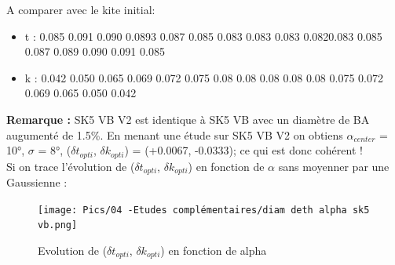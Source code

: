 A comparer avec le kite initial:
\begin{itemize}
    \item t : 0.085 0.091 0.090 0.0893 0.087 0.085 0.083 0.083 0.083 0.0820.083 0.085 0.087 0.089 0.090 0.091 0.085
    \item k : 0.042 0.050 0.065 0.069 0.072 0.075 0.08 0.08 0.08 0.08 0.08 0.075 0.072 0.069 0.065 0.050 0.042   
\end{itemize}

\textbf{Remarque :} SK5 VB V2 est identique à SK5 VB avec un diamètre de BA augumenté de 1.5\%. En menant une étude sur SK5 VB V2 on obtiens $\alpha_{center}$ = 10°, $\sigma$ = 8°, ($\delta t_{opti}$, $\delta k_{opti}$) = (+0.0067, -0.0333); ce qui est donc cohérent !\\

Si on trace l'évolution de ($\delta t_{opti}$, $\delta k_{opti}$) en fonction de $\alpha$ sans moyenner par une Gaussienne :\\

\begin{figure}[H]
    \centering
    \texttt{[image: Pics/04 -Etudes complémentaires/diam deth alpha sk5 vb.png]}
    \caption{Evolution de ($\delta t_{opti}$, $\delta k_{opti}$) en fonction de alpha}
    \label{fig:diam deth alpha sk5 vb}
\end{figure}
